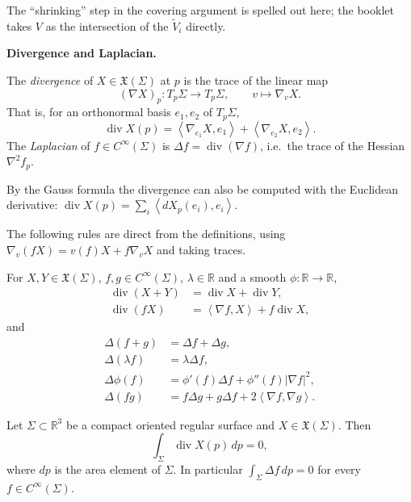 The ``shrinking'' step in the covering
argument is spelled out here; the booklet
takes $V$ as the intersection of the
$\tilde{V}_i$ directly.

\medskip\noindent
{\bf Divergence and Laplacian.}

\begin{definition}
\label{definition-alias-divergence}
The \emph{divergence} of
$X\in\mathfrak{X}(\Sigma)$ at $p$ is the
trace of the linear map
$$
(\nabla X)_p:T_p\Sigma\to T_p\Sigma,
\qquad
v\mapsto\nabla_vX.
$$
That is, for an orthonormal basis
$e_1,e_2$ of $T_p\Sigma$,
$$
\operatorname{div}X(p)
=\left\langle{} \nabla_{e_1}X,e_1
\right\rangle{}
+\left\langle{} \nabla_{e_2}X,e_2
\right\rangle{}.
$$
The \emph{Laplacian} of
$f\in C^\infty(\Sigma)$ is
$\Delta f=\operatorname{div}(\nabla f)$,
i.e.\ the trace of the Hessian
$\nabla^2f_p$.
\end{definition}

By the Gauss formula the divergence can
also be computed with the Euclidean
derivative:
$\operatorname{div}X(p)=\sum_i
\left\langle{} dX_p(e_i),e_i
\right\rangle{}$.

The following rules are direct from the
definitions, using
$\nabla_v(fX)=v(f)X+f\nabla_vX$ and
taking traces.

\begin{proposition}
\label{proposition-alias-div-laplacian}
For $X,Y\in\mathfrak{X}(\Sigma)$,
$f,g\in C^\infty(\Sigma)$,
$\lambda\in\mathbb{R}$ and a smooth
$\phi:\mathbb{R}\to\mathbb{R}$,
$$
\begin{aligned}
\operatorname{div}(X+Y)
&=\operatorname{div}X
+\operatorname{div}Y,\\
\operatorname{div}(fX)
&=\left\langle{} \nabla f,X
\right\rangle{}+f\operatorname{div}X,
\end{aligned}
$$
and
$$
\begin{aligned}
\Delta(f+g)&=\Delta f+\Delta g,\\
\Delta(\lambda f)&=\lambda\Delta f,\\
\Delta\phi(f)&=\phi'(f)\Delta f
+\phi''(f)|\nabla f|^2,\\
\Delta(fg)&=f\Delta g+g\Delta f
+2\left\langle{} \nabla f,\nabla g
\right\rangle{}.
\end{aligned}
$$
\end{proposition}

\begin{theorem}
\label{theorem-alias-divergence}
Let $\Sigma\subset\mathbb{R}^3$ be a
compact oriented regular surface and
$X\in\mathfrak{X}(\Sigma)$. Then
$$
\int_\Sigma\operatorname{div}X(p)\,dp=0,
$$
where $dp$ is the area element of
$\Sigma$. In particular
$\int_\Sigma\Delta f\,dp=0$ for every
$f\in C^\infty(\Sigma)$.
\end{theorem}

